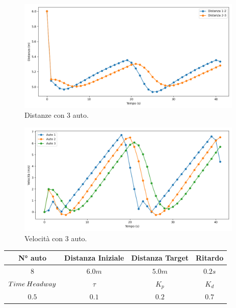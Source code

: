 \begin{figure}[H]
    \includegraphics[width=0.96\textwidth]{images/5-experiment/car-number/distance_3.png}
    \caption{Distanze con 3 auto.}
    \label{fig:3-cars-distance}
\end{figure}

\begin{figure}[H]
    \includegraphics[width=0.96\textwidth]{images/5-experiment/car-number/velocity_3.png}
    \caption{Velocità con 3 auto.}
    \label{fig:3-cars-velocity}
\end{figure}
\vspace*{\fill}
\newpage
\vspace*{\fill}
\begin{table}[h]
    \centering
    \begin{tabular}{|c|c|c|c|}
        \hline
        N° auto & Distanza Iniziale & Distanza Target & Ritardo \\
        \hline
        $8$ & $6.0 m$ & $5.0 m$ & $0.2 s$ \\
        \hline
        $Time\hspace{0.2em}Headway$ & $\tau$ & $K_p$ & $K_d$  \\
        \hline
        $0.5$ & $0.1$ & $0.2$ & $0.7$ \\
        \hline
    \end{tabular}
\end{table}

